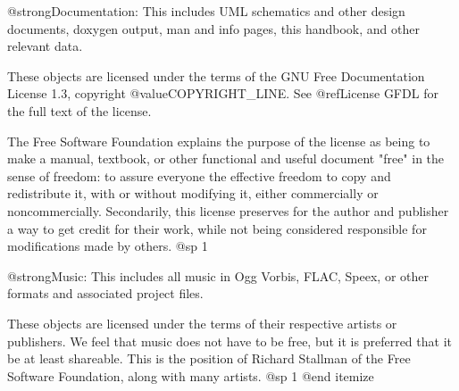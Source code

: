 \item
@strong{Documentation:} This includes UML schematics and other design documents, doxygen output, man and info pages, this handbook, and other relevant data.

These objects are licensed under the terms of the GNU Free Documentation License 1.3, copyright @value{COPYRIGHT_LINE}. See @ref{License GFDL} for the full text of the license.

The Free Software Foundation explains the purpose of the license as being to make a manual, textbook, or other functional and useful document "free" in the sense of freedom: to assure everyone the effective freedom to copy and redistribute it, with or without modifying it, either commercially or noncommercially. Secondarily, this license preserves for the author and publisher a way to get credit for their work, while not being considered responsible for modifications made by others.
@sp 1

\item
@strong{Music:} This includes all music in Ogg Vorbis, FLAC, Speex, or other formats and associated project files.

These objects are licensed under the terms of their respective artists or publishers. We feel that music does not have to be free, but it is preferred that it be at least shareable. This is the position of Richard Stallman of the Free Software Foundation, along with many artists.
@sp 1
@end itemize

